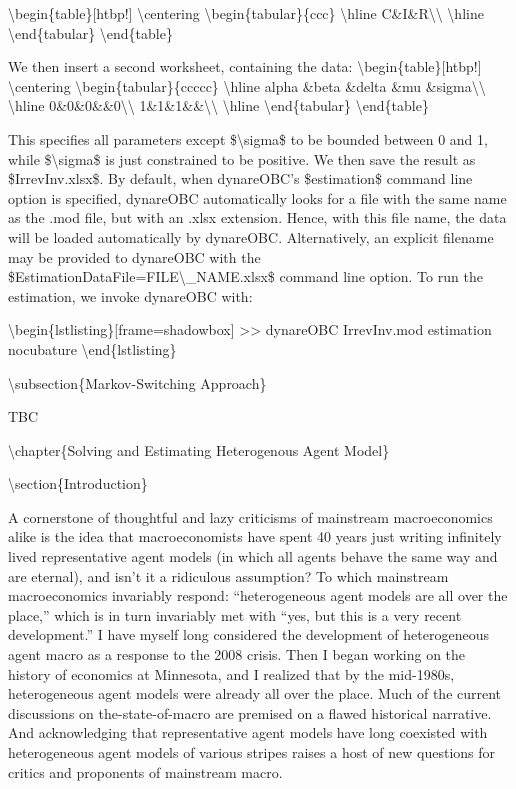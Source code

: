 \documentclass[10pt,math=newtx,citestyle=gb7714-2015,bibstyle=gb7714-2015]{elegantbook}
\begin{document}
	\textbackslash{}begin\{table\}[htbp!]
	\textbackslash{}centering
	\textbackslash{}begin\{tabular\}\{ccc\}
	\textbackslash{}hline
	C\&I\&R\textbackslash{}\textbackslash{}
	\textbackslash{}hline
	\textbackslash{}end\{tabular\}
	\textbackslash{}end\{table\}
	
	We then insert a second worksheet, containing the data:
	\textbackslash{}begin\{table\}[htbp!]
	\textbackslash{}centering
	\textbackslash{}begin\{tabular\}\{ccccc\}
	\textbackslash{}hline
	alpha \&beta \&delta \&mu \&sigma\textbackslash{}\textbackslash{}
	\textbackslash{}hline
	0\&0\&0\&\&0\textbackslash{}\textbackslash{}
	1\&1\&1\&\&\textbackslash{}\textbackslash{}
	\textbackslash{}hline
	\textbackslash{}end\{tabular\}
	\textbackslash{}end\{table\}
	
	This specifies all parameters except \$\textbackslash{}sigma\$ to be bounded between 0 and 1, while \$\textbackslash{}sigma\$ is just constrained to be positive. We then save the result as \$IrrevInv.xlsx\$. By default, when dynareOBC’s \$estimation\$ command line option is specified, dynareOBC automatically looks for a file with the same name as the .mod file, but with an .xlsx extension. Hence, with this file name, the data will be loaded automatically by dynareOBC. Alternatively, an explicit filename may be provided
	to dynareOBC with the \$EstimationDataFile=FILE\textbackslash{}\_NAME.xlsx\$ command line option. To run the estimation, we invoke dynareOBC with:
	
	\textbackslash{}begin\{lstlisting\}[frame=shadowbox]
	>> dynareOBC IrrevInv.mod estimation nocubature
	\textbackslash{}end\{lstlisting\}
	
	\textbackslash{}subsection\{Markov-Switching Approach\}
	
	TBC
	
	
	\textbackslash{}chapter\{Solving and Estimating Heterogenous Agent Model\}
	
	\textbackslash{}section\{Introduction\}
	
	A cornerstone of thoughtful and lazy criticisms of mainstream macroeconomics alike is the idea that macroeconomists have spent 40 years just writing infinitely lived representative agent models (in which all agents behave the same way and are eternal), and isn’t it a ridiculous assumption? To which mainstream macroeconomics invariably respond: “heterogeneous agent models are all over the place,” which is in turn invariably met with “yes, but this is a very recent development.” I have myself long considered the development of heterogeneous agent macro as a response to the 2008 crisis. Then I began working on the history of economics at Minnesota, and I realized that by the mid-1980s, heterogeneous agent models were already all over the place. Much of the current discussions on the-state-of-macro are premised on a flawed historical narrative. And acknowledging that representative agent models have long coexisted with heterogeneous agent models of various stripes raises a host of new questions for critics and proponents of mainstream macro.
	
\end{document}
